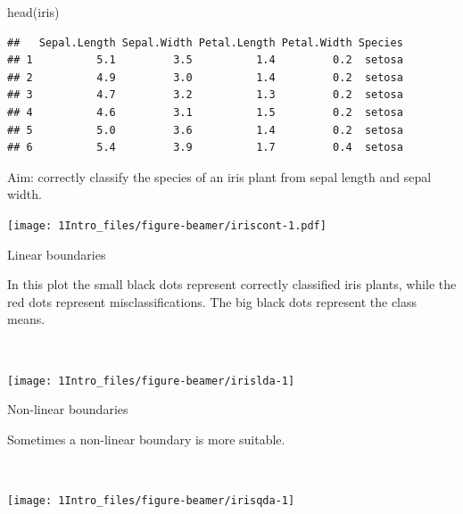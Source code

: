\documentclass[
  10pt,
  ignorenonframetext,
]{beamer}
\newenvironment{Shaded}{\begin{snugshade}}{\end{snugshade}}
\newcommand{\FunctionTok}[1]{\textcolor[rgb]{0.00,0.00,0.00}{#1}}
\newcommand{\NormalTok}[1]{#1}
\begin{document}
\begin{frame}[fragile]
\scriptsize

\begin{Shaded}
\begin{Highlighting}[]
\FunctionTok{head}\NormalTok{(iris)}
\end{Highlighting}
\end{Shaded}

\begin{verbatim}
##   Sepal.Length Sepal.Width Petal.Length Petal.Width Species
## 1          5.1         3.5          1.4         0.2  setosa
## 2          4.9         3.0          1.4         0.2  setosa
## 3          4.7         3.2          1.3         0.2  setosa
## 4          4.6         3.1          1.5         0.2  setosa
## 5          5.0         3.6          1.4         0.2  setosa
## 6          5.4         3.9          1.7         0.4  setosa
\end{verbatim}

\normalsize
\end{frame}

\begin{frame}
Aim: correctly classify the species of an iris plant from sepal length
and sepal width.

\texttt{[image: 1Intro\_files/figure-beamer/iriscont-1.pdf]}
\end{frame}

\begin{frame}
\begin{block}{Linear boundaries}
\protect\hypertarget{linear-boundaries}{}
\vspace{2mm}

In this plot the small black dots represent correctly classified iris
plants, while the red dots represent misclassifications. The big black
dots represent the class means.

~

\texttt{[image: 1Intro\_files/figure-beamer/irislda-1]}
\end{block}
\end{frame}

\begin{frame}
\begin{block}{Non-linear boundaries}
\protect\hypertarget{non-linear-boundaries}{}
\vspace{2mm}

Sometimes a non-linear boundary is more suitable.

\(~\)

\texttt{[image: 1Intro\_files/figure-beamer/irisqda-1]}
\end{block}
\end{frame}
\end{document}
